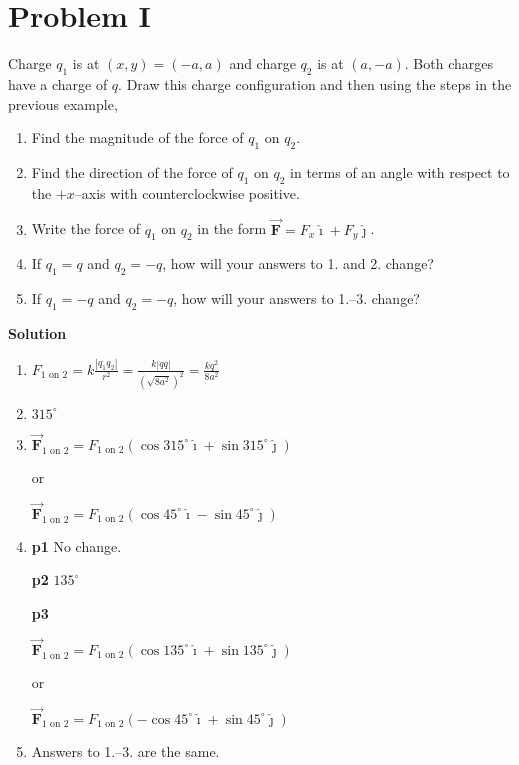 \documentclass{article}
\renewcommand{\mbox}{\text}
\newcommand{\ds}[0]{\displaystyle}
\newcommand{\ihat}[0]{\hat{\boldsymbol{\imath}}}
\newcommand{\jhat}[0]{\hat{\boldsymbol{\jmath}}}
\newcommand{\bfvec}[1]{\vec{\mathbf{#1}}}
\begin{document}
\newpage

\section{Problem I}

Charge $q_1$ is at $(x,y)=(-a,a)$ and charge $q_2$ is at $(a, -a)$. Both charges have a charge of $q$. Draw this charge configuration and then using the steps in the previous example,

\begin{enumerate}

  \item Find the magnitude of the force of $q_1$ on $q_2$.

  \item Find the direction of the force of $q_1$ on $q_2$ in terms of an angle with respect to the $+x$--axis with counterclockwise positive.

  \item Write the force of $q_1$ on $q_2$ in the form $\bfvec{F}=F_x\ihat + F_y\jhat$.

  \item If $q_1=q$ and $q_2=-q$, how will your answers to 1. and 2. change?

  \item If $q_1=-q$ and $q_2=-q$, how will your answers to 1.--3. change?

\end{enumerate}

\ifsolutions
{\bf Solution}

    \begin{enumerate}

      \item $\ds F_{1\mbox{ on } 2}=k\frac{|q_1q_2|}{r^2}=\frac{k|qq|}{(\sqrt{8a^2})^2}=\frac{kq^2}{8a^2}$

      \item $315^\circ$

      \item $\bfvec{F}_{1\mbox{ on } 2} = F_{1\mbox{ on } 2}(\cos 315^\circ \ihat + \sin 315^\circ \jhat)$

            or

            $\bfvec{F}_{1\mbox{ on } 2} = F_{1\mbox{ on } 2}(\cos 45^\circ \ihat - \sin 45^\circ \jhat)$

      \item \textbf{p1} No change.

            \textbf{p2} $135^\circ$

            \textbf{p3}

            $\bfvec{F}_{1\mbox{ on } 2} = F_{1\mbox{ on } 2}(\cos 135^\circ \ihat + \sin 135^\circ \jhat)$

            or

            $\bfvec{F}_{1\mbox{ on } 2} = F_{1\mbox{ on } 2}(-\cos 45^\circ \ihat + \sin 45^\circ \jhat)$

      \item Answers to 1.--3. are the same.

    \end{enumerate}
\else
\end{document}
